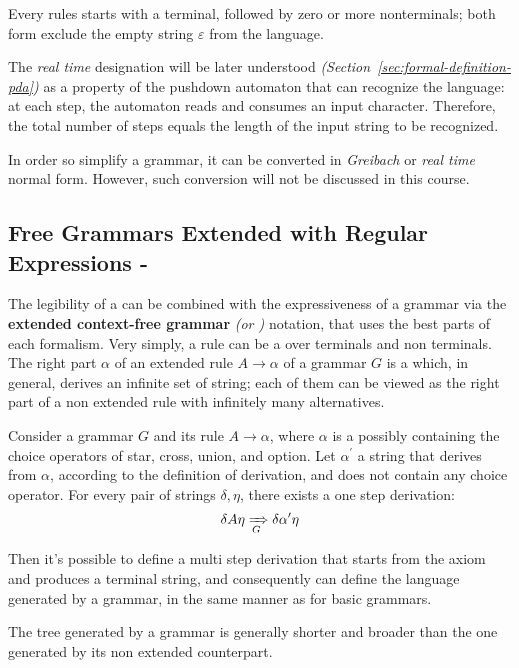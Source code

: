 \documentclass[english]{article}
\begin{document}
Every rules starts with a terminal, followed by zero or more nonterminals;
both form exclude the empty string \(\varepsilon\) from the language.

The \textit{real time} designation will be later understood \textit{(Section~\ref{sec:formal-definition-pda})} as a property of the pushdown automaton that can recognize the language:
at each step, the automaton reads and consumes an input character.
Therefore, the total number of steps equals the length of the input string to be recognized.

In order so simplify a grammar, it can be converted in \textit{Greibach} or \textit{real time} normal form.
However, such conversion will not be discussed in this course.

\subsection{Free Grammars Extended with Regular Expressions - \EBNF}
\label{sec:free-grammars-extended-with-regular-expressions}

The legibility of a \re can be combined with the expressiveness of a grammar via the \textbf{extended context-free grammar} \textit{(or \EBNF)} notation, that uses the best parts of each formalism.
Very simply, a rule \RP can be a \re over terminals and non terminals.
The right part \(\alpha\) of an extended rule \(A \rightarrow \alpha\) of a grammar \(G\) is a \re which, in general, derives an infinite set of string;
each of them can be viewed as the right part of a non extended rule with infinitely many alternatives.

Consider a grammar \(G\) and its rule \(A \rightarrow \alpha\), where \(\alpha\) is a \re possibly containing the choice operators of star, cross, union, and option.
Let \(\alpha^\prime\) a string that derives from \(\alpha\), according to the definition of \re derivation, and does not contain any choice operator.
For every pair of strings \(\delta, \eta\), there exists a one step derivation:
\[ \delta A \eta \xRightarrow[G]{} \delta \alpha^\prime \eta \]

Then it's possible to define a multi step derivation that starts from the axiom and produces a terminal string, and consequently can define the language generated by a \EBNF grammar, in the same manner as for basic grammars.

The tree generated by a \EBNF grammar is generally shorter and broader than the one generated by its non extended counterpart.
\end{document}
